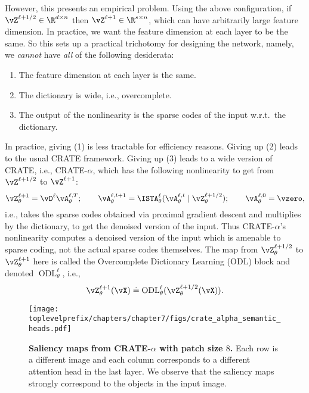 \documentclass[../../book-main.tex]{subfiles}
\begin{document}
However, this presents an empirical problem. Using the above configuration, if \(\vZ^{\ell + 1/2} \in \R^{d \times n}\) then \(\vZ^{\ell + 1} \in \R^{s \times n}\), which can have arbitrarily large feature dimension. In practice, we want the feature dimension at each layer to be the same. So this sets up a practical trichotomy for designing the network, namely, we \textit{cannot} have \textit{all} of the following desiderata:
\begin{enumerate}
    \item The feature dimension at each layer is the same.
    \item The dictionary is wide, i.e., overcomplete.
    \item The output of the nonlinearity is the sparse codes of the input w.r.t.~the dictionary.
\end{enumerate}
In practice, giving (1) is less tractable for efficiency reasons. Giving up (2) leads to the usual CRATE framework. Giving up (3) leads to a wide version of CRATE, i.e., CRATE-\(\alpha\), which has the following nonlinearity to get from \(\vZ^{\ell + 1/2}\) to \(\vZ^{\ell + 1}\):
\begin{equation}
    \vZ_{\theta}^{\ell + 1} = \vD^{\ell}\vA_{\theta}^{\ell, T}; \qquad \vA_{\theta}^{\ell, t + 1} = \ISTA_{\theta}^{\ell}(\vA_{\theta}^{\ell, t} \mid \vZ_{\theta}^{\ell + 1/2}); \qquad \vA_{\theta}^{\ell, 0} = \vzero,
\end{equation}
i.e., takes the sparse codes obtained via proximal gradient descent and multiplies by the dictionary, to get the denoised version of the input. Thus CRATE-\(\alpha\)'s nonlinearity computes a denoised version of the input which is amenable to sparse coding, not the actual sparse codes themselves. The map from \(\vZ_{\theta}^{\ell + 1/2}\) to \(\vZ_{\theta}^{\ell + 1}\) here is called the Overcomplete Dictionary Learning (ODL) block and denoted \(\operatorname{ODL}_{\theta}^{\ell}\), i.e.,
\begin{equation}
    \vZ_{\theta}^{\ell + 1}(\vX) \doteq \operatorname{ODL}_{\theta}^{\ell}(\vZ_{\theta}^{\ell + 1/2}(\vX)).
\end{equation}



\begin{figure}[t]
    \centering 
    \texttt{[image: \\toplevelprefix/chapters/chapter7/figs/crate\_alpha\_semantic\_heads.pdf]}
    \caption{\small\textbf{Saliency maps from CRATE-\(\alpha\) with patch size \(8\).} Each row is a different image and each column corresponds to a different attention head in the last layer. We observe that the saliency maps strongly correspond to the objects in the input image.}
    \label{fig:crate_alpha_saliency_maps}
\end{figure}
\end{document}
